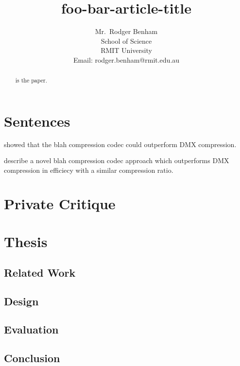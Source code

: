 \documentclass{article}
\begin{document}
\title{foo-bar-article-title}

\author{Mr.~Rodger Benham\\
School of Science\\
RMIT University\\
Email: rodger.benham@rmit.edu.au
}

\maketitle

\begin{abstract}
\citet{foo-bar-pcode} is the paper.
\end{abstract}

\section{Sentences}

\citet{foo-bar-pcode} showed that the blah compression codec could outperform DMX compression.

\citet{foo-bar-pcode} describe a novel blah compression codec approach which outperforms DMX compression in efficiecy with a similar compression ratio.


\section{Private Critique}

\section{Thesis}

\subsection{Related Work}

\subsection{Design}

\subsection{Evaluation}

\subsection{Conclusion}

\nocite{*} %


\end{document}
